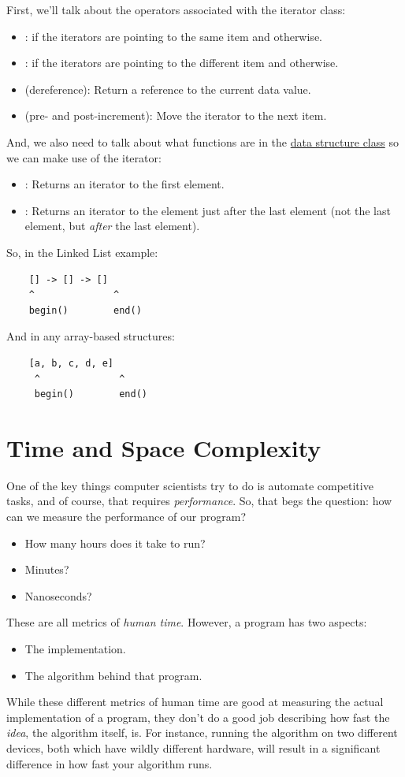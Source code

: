 \documentclass[letterpaper]{article}
\begin{document}
\bigskip 

First, we'll talk about the operators associated with the iterator class: 
\begin{itemize}
    \item \code{==}:  if the iterators are pointing to the same item and  otherwise. 
    \item \code{!=}:  if the iterators are pointing to the different item and  otherwise. 
    \item \code{*} (dereference): Return a reference to the current data value. 
    \item \code{++} (pre- and post-increment): Move the iterator to the next item. 
\end{itemize}

And, we also need to talk about what functions are in the \underline{data structure class} so we can make use of the iterator:
\begin{itemize}
    \item {}: Returns an iterator to the first element. 
    \item {}: Returns an iterator to the element just after the last element (not the last element, but \emph{after} the last element).  
\end{itemize}
So, in the Linked List example: 
\begin{verbatim}
    [] -> [] -> []
    ^              ^
    begin()        end()
\end{verbatim}
And in any array-based structures: 
\begin{verbatim}
    [a, b, c, d, e]
     ^              ^
     begin()        end()
\end{verbatim}


\newpage
\section{Time and Space Complexity}
One of the key things computer scientists try to do is automate competitive tasks, and of course, that requires \emph{performance}. So, that begs the question: how can we measure the performance of our program? 
\begin{itemize}
    \item How many hours does it take to run? 
    \item Minutes? 
    \item Nanoseconds? 
\end{itemize}
These are all metrics of \emph{human time}. However, a program has two aspects: 
\begin{itemize}
    \item The implementation. 
    \item The algorithm behind that program. 
\end{itemize}
While these different metrics of human time are good at measuring the actual implementation of a program, they don't do a good job describing how fast the \emph{idea}, the algorithm itself, is. For instance, running the algorithm on two different devices, both which have wildly different hardware, will result in a significant difference in how fast your algorithm runs. 
\end{document}
